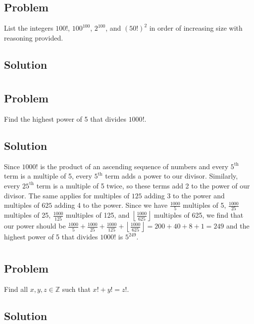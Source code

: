 \documentclass[12pt]{article}
\newcommand{\floor}[1]{\left\lfloor #1 \right\rfloor}
\newcommand{\Z}    [0]{\mathbb{Z}                   }
\begin{document}
\section{}

\subsection{Problem}
List the integers $100!$, $100^{100}$, $2^{100}$, and $(50!)^2$ in order of increasing size with reasoning provided.

\subsection{Solution}



\section{}

\subsection{Problem}
Find the highest power of 5 that divides $1000!$.

\subsection{Solution}
Since $1000!$ is the product of an ascending sequence of numbers and every $5^\text{th}$ term is a multiple of 5, every $5^\text{th}$ term adds a power to our divisor. Similarly, every $25^\text{th}$ term is a multiple of 5 twice, so these terms add 2 to the power of our divisor. The same applies for multiples of $125$ adding 3 to the power and multiples of $625$ adding 4 to the power. Since we have $\frac{1000}{5}$ multiples of 5, $\frac{1000}{25}$ multiples of 25, $\frac{1000}{125}$ multiples of 125, and $\floor{\frac{1000}{625}}$ multiples of 625, we find that our power should be $\frac{1000}{5} + \frac{1000}{25} + \frac{1000}{125} + \floor{\frac{1000}{625}} = 200 + 40 + 8 + 1 = 249$ and the highest power of 5 that divides $1000!$ is $\boxed{5^{249}}$.



\section{}

\subsection{Problem}
Find all $x, y, z \in \Z$ such that $x! + y! = z!$.

\subsection{Solution}
\end{document}
